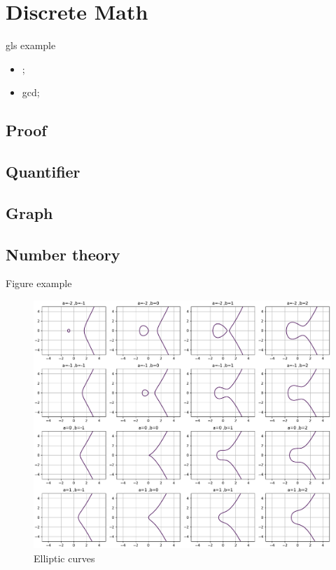 \chapter{Discrete Math}\label{chp:discrete_math}
\minitoc
gls example
\begin{itemize}
	\item {};
	\item \Gls{gcd};
\end{itemize}

\section{Proof}
\begin{lemma}
\end{lemma}
\begin{claim}
\end{claim}
\begin{theorem}
\end{theorem}
\begin{example}
\end{example}
\begin{fact}
\end{fact}
\begin{remark}
\end{remark}
\lipsum %

\section{Quantifier}
\lipsum %

\section{Graph}
\cite{babaiGraphIsomorphismQuasipolynomial2016}

\section{Number theory}
Figure example
\begin{figure}[!ht]
    \centering
    \includegraphics[width=1\linewidth]{./figure/elliptic_curves.pdf}
    \caption{Elliptic curves \cite{childsUniversalComputationQuantum2009} }
\end{figure}